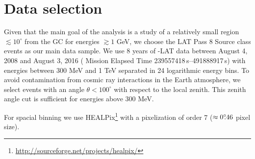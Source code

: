 \section{Data selection}

Given that the main goal of the analysis is a study of a relatively small region $\lesssim 10^\circ$ from the GC for energies $\gtrsim 1$ GeV,
we choose the \Fermi LAT Pass 8 Source class events as our main data sample.
We use 8 years of {\Fermi}-LAT data between August 4, 2008  and August 3, 2016 ({\Fermi} Mission Elapsed Time 239557418\,s--491888917\,s)
with energies between 300 MeV 
and 1 TeV separated in 24 logarithmic energy bins.
To avoid contamination from cosmic ray interactions in the Earth atmosphere, 
we select events with an angle $\theta < 100^{\circ}$ with respect to the local zenith.
This zenith angle cut is sufficient for energies above 300 MeV.

For spacial binning we use HEALPix\footnote{\url{http://sourceforge.net/projects/healpix/}} \citep{2005ApJ...622..759G} with a pixelization of order 7 
($\approx 0^\circ\!\!.46$ pixel size). 